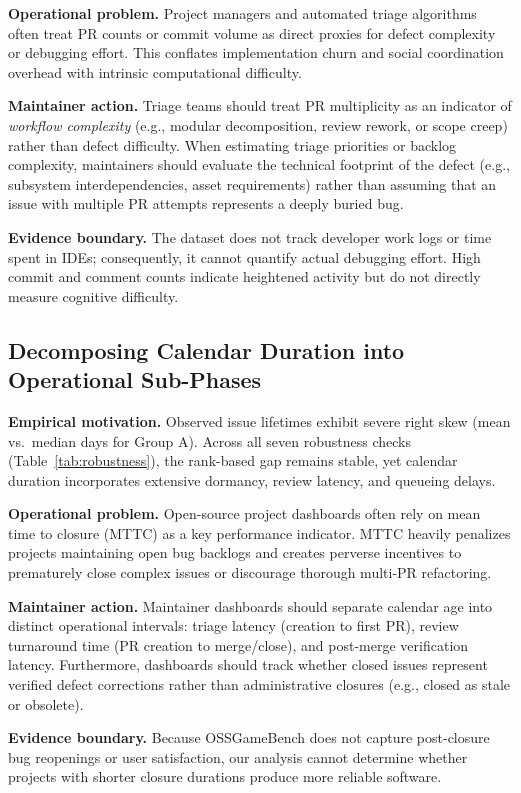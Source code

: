 \textbf{Operational problem.} Project managers and automated triage algorithms often treat PR counts or commit volume as direct proxies for defect complexity or debugging effort. This conflates implementation churn and social coordination overhead with intrinsic computational difficulty.

\textbf{Maintainer action.} Triage teams should treat PR multiplicity as an indicator of \emph{workflow complexity} (e.g., modular decomposition, review rework, or scope creep) rather than defect difficulty. When estimating triage priorities or backlog complexity, maintainers should evaluate the technical footprint of the defect (e.g., subsystem interdependencies, asset requirements) rather than assuming that an issue with multiple PR attempts represents a deeply buried bug.

\textbf{Evidence boundary.} The dataset does not track developer work logs or time spent in IDEs; consequently, it cannot quantify actual debugging effort. High commit and comment counts indicate heightened activity but do not directly measure cognitive difficulty.

\subsection{Decomposing Calendar Duration into Operational Sub-Phases}
\textbf{Empirical motivation.} Observed issue lifetimes exhibit severe right skew (mean \valmeanA{} vs.\ median \valmedA{} days for Group A). Across all seven robustness checks (Table~\ref{tab:robustness}), the rank-based gap remains stable, yet calendar duration incorporates extensive dormancy, review latency, and queueing delays.

\textbf{Operational problem.} Open-source project dashboards often rely on mean time to closure (MTTC) as a key performance indicator. MTTC heavily penalizes projects maintaining open bug backlogs and creates perverse incentives to prematurely close complex issues or discourage thorough multi-PR refactoring.

\textbf{Maintainer action.} Maintainer dashboards should separate calendar age into distinct operational intervals: triage latency (creation to first PR), review turnaround time (PR creation to merge/close), and post-merge verification latency. Furthermore, dashboards should track whether closed issues represent verified defect corrections rather than administrative closures (e.g., closed as stale or obsolete).

\textbf{Evidence boundary.} Because OSSGameBench does not capture post-closure bug reopenings or user satisfaction, our analysis cannot determine whether projects with shorter closure durations produce more reliable software.


